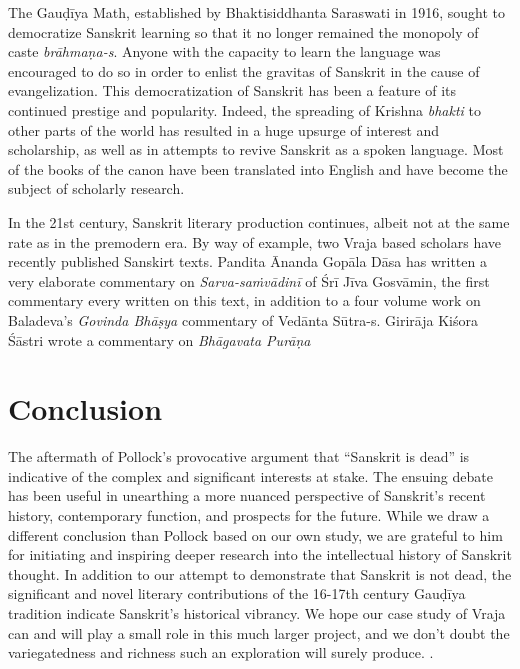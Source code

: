 The Gauḍīya Math, established by Bhaktisiddhanta Saraswati in 1916, sought to democratize Sanskrit learning so that it no longer remained the monopoly of caste {\sl brāhmaṇa-s}. Anyone with the capacity to learn the language was encouraged to do so in order to enlist the gravitas of Sanskrit in the cause of evangelization. This democratization of Sanskrit has been a feature of its continued prestige and popularity. Indeed, the spreading of Krishna {\sl bhakti} to other parts of the world has resulted in a huge upsurge of interest and scholarship, as well as in attempts to revive Sanskrit as a spoken language. Most of the books of the canon have been translated into English and have become the subject of scholarly research. 

In the 21st century, Sanskrit literary production continues, albeit not at the same rate as in the premodern era. By way of example, two Vraja based scholars have recently published Sanskirt texts. Pandita Ānanda Gopāla Dāsa has written a very elaborate commentary on {\sl Sarva-saṁvādinī} of Śrī Jīva Gosvāmin, the first commentary every written on this text, in addition to a four volume work on Baladeva’s {\sl Govinda Bhāṣya} commentary of Vedānta Sūtra-s. Girirāja Kiśora Śāstri wrote a commentary on {\sl Bhāgavata Purāṇa}

\section*{Conclusion}

The aftermath of Pollock’s provocative argument that “Sanskrit is dead” is indicative of the complex and significant interests at stake. The ensuing debate has been useful in unearthing a more nuanced perspective of Sanskrit’s recent history, contemporary function, and prospects for the future. While we draw a different conclusion than Pollock based on our own study, we are grateful to him for initiating and inspiring deeper research into the intellectual history of Sanskrit thought. In addition to our attempt to demonstrate that Sanskrit is not dead, the significant and novel literary contributions of the 16-17th century Gauḍīya tradition indicate Sanskrit’s historical vibrancy. We hope our case study of Vraja can and will play a small role in this much larger project, and we don’t doubt the variegatedness and richness such an exploration will surely produce. .


